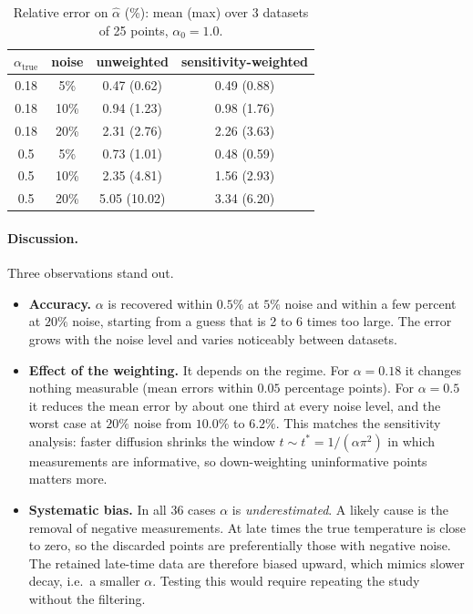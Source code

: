 \documentclass[10pt]{article}
\begin{document}
\begin{table}[h]
\centering
\begin{tabular}{cccc}
\toprule
$\alpha_{\text{true}}$ & noise & unweighted & sensitivity-weighted\\
\midrule
0.18 & 5\% & 0.47 (0.62) & 0.49 (0.88) \\
0.18 & 10\% & 0.94 (1.23) & 0.98 (1.76) \\
0.18 & 20\% & 2.31 (2.76) & 2.26 (3.63) \\
0.5 & 5\% & 0.73 (1.01) & 0.48 (0.59) \\
0.5 & 10\% & 2.35 (4.81) & 1.56 (2.93) \\
0.5 & 20\% & 5.05 (10.02) & 3.34 (6.20) \\
\bottomrule
\end{tabular}
\caption{Relative error on $\hat\alpha$ (\%): mean (max) over 3 datasets of 25 points, $\alpha_0=1.0$.}
\label{tab:robust}
\end{table}

\paragraph{Discussion.} Three observations stand out.
\begin{itemize}
\item \textbf{Accuracy.} $\alpha$ is recovered within $0.5\%$ at $5\%$ noise and within a few percent at $20\%$ noise, starting from a guess that is 2 to 6 times too large. The error grows with the noise level and varies noticeably between datasets.
\item \textbf{Effect of the weighting.} It depends on the regime. For $\alpha=0.18$ it changes nothing measurable (mean errors within $0.05$ percentage points). For $\alpha=0.5$ it reduces the mean error by about one third at every noise level, and the worst case at $20\%$ noise from $10.0\%$ to $6.2\%$. This matches the sensitivity analysis: faster diffusion shrinks the window $t\sim t^\ast=1/(\alpha\pi^2)$ in which measurements are informative, so down-weighting uninformative points matters more.
\item \textbf{Systematic bias.} In all 36 cases $\alpha$ is \emph{underestimated}. A likely cause is the removal of negative measurements. At late times the true temperature is close to zero, so the discarded points are preferentially those with negative noise. The retained late-time data are therefore biased upward, which mimics slower decay, i.e.\ a smaller $\alpha$. Testing this would require repeating the study without the filtering.
\end{itemize}
\end{document}
